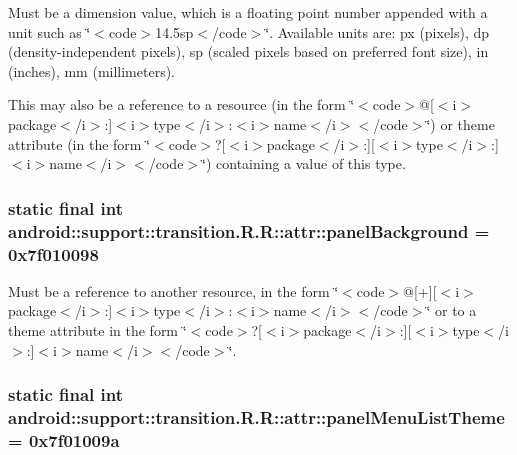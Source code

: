 Must be a dimension value, which is a floating point number appended with a unit such as \char`\"{}$<$code$>$14.5sp$<$/code$>$\char`\"{}. Available units are: px (pixels), dp (density-independent pixels), sp (scaled pixels based on preferred font size), in (inches), mm (millimeters). 

This may also be a reference to a resource (in the form \char`\"{}$<$code$>$@\mbox{[}$<$i$>$package$<$/i$>$:\mbox{]}$<$i$>$type$<$/i$>$:$<$i$>$name$<$/i$>$$<$/code$>$\char`\"{}) or theme attribute (in the form \char`\"{}$<$code$>$?\mbox{[}$<$i$>$package$<$/i$>$:\mbox{]}\mbox{[}$<$i$>$type$<$/i$>$:\mbox{]}$<$i$>$name$<$/i$>$$<$/code$>$\char`\"{}) containing a value of this type. \hypertarget{classandroid_1_1support_1_1transition_1_1_r_1_1attr_d6c04dd979c61fae7386ae91414e5564}{
\subsubsection[{panelBackground}]{\setlength{\rightskip}{0pt plus 5cm}static final int android::support::transition.R.R::attr::panelBackground = 0x7f010098}}
\label{classandroid_1_1support_1_1transition_1_1_r_1_1attr_d6c04dd979c61fae7386ae91414e5564}


Must be a reference to another resource, in the form \char`\"{}$<$code$>$@\mbox{[}+\mbox{]}\mbox{[}$<$i$>$package$<$/i$>$:\mbox{]}$<$i$>$type$<$/i$>$:$<$i$>$name$<$/i$>$$<$/code$>$\char`\"{} or to a theme attribute in the form \char`\"{}$<$code$>$?\mbox{[}$<$i$>$package$<$/i$>$:\mbox{]}\mbox{[}$<$i$>$type$<$/i$>$:\mbox{]}$<$i$>$name$<$/i$>$$<$/code$>$\char`\"{}. \hypertarget{classandroid_1_1support_1_1transition_1_1_r_1_1attr_32518f1a5d0f92be06253a7bff81bef3}{
\subsubsection[{panelMenuListTheme}]{\setlength{\rightskip}{0pt plus 5cm}static final int android::support::transition.R.R::attr::panelMenuListTheme = 0x7f01009a}}
\label{classandroid_1_1support_1_1transition_1_1_r_1_1attr_32518f1a5d0f92be06253a7bff81bef3}



